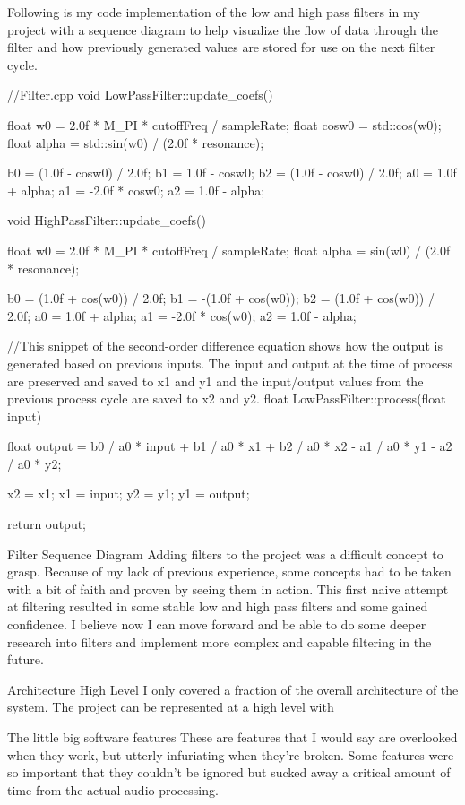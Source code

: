 \documentclass[acmlarge,screen]{acmart}
\begin{document}
Following is my code implementation of the low and high pass filters in my project with a sequence diagram to help visualize the flow of data through the filter and how previously generated values are stored for use on the next filter cycle.

//Filter.cpp
void LowPassFilter::update_coefs() {
	float w0 = 2.0f * M_PI * cutoffFreq / sampleRate;
	float cosw0 = std::cos(w0);
	float alpha = std::sin(w0) / (2.0f * resonance);
	
	b0 = (1.0f - cosw0) / 2.0f;
	b1 = 1.0f - cosw0;
	b2 = (1.0f - cosw0) / 2.0f;
	a0 = 1.0f + alpha;
	a1 = -2.0f * cosw0;
	a2 = 1.0f - alpha;
}

void HighPassFilter::update_coefs() {
	float w0 = 2.0f * M_PI * cutoffFreq / sampleRate;
	float alpha = sin(w0) / (2.0f * resonance);
	
	b0 = (1.0f + cos(w0)) / 2.0f;
	b1 = -(1.0f + cos(w0));
	b2 = (1.0f + cos(w0)) / 2.0f;
	a0 = 1.0f + alpha;
	a1 = -2.0f * cos(w0);
	a2 = 1.0f - alpha;
}

//This snippet of the second-order difference equation shows how the output is generated based on previous inputs. The input and output at the time of process are preserved and saved to x1 and y1 and the input/output values from the previous process cycle are saved to x2 and y2.
float LowPassFilter::process(float input) {
	float output = b0 / a0 * input + b1 / a0 * x1 + b2 / a0 * x2
	- a1 / a0 * y1 - a2 / a0 * y2;
	
	x2 = x1;
	x1 = input;
	y2 = y1;
	y1 = output;
	
	return output;
}
Filter Sequence Diagram
Adding filters to the project was a difficult concept to grasp. Because of my lack of previous experience, some concepts had to be taken with a bit of faith and proven by seeing them in action. This first naive attempt at filtering resulted in some stable low and high pass filters and some gained confidence. I believe now I can move forward and be able to do some deeper research into filters and implement more complex and capable filtering in the future.

Architecture High Level
I only covered a fraction of the overall architecture of the system. The project can be represented at a high level with

The little big software features
These are features that I would say are overlooked when they work, but utterly infuriating when they're broken. Some features were so important that they couldn't be ignored but sucked away a critical amount of time from the actual audio processing.
\end{document}

